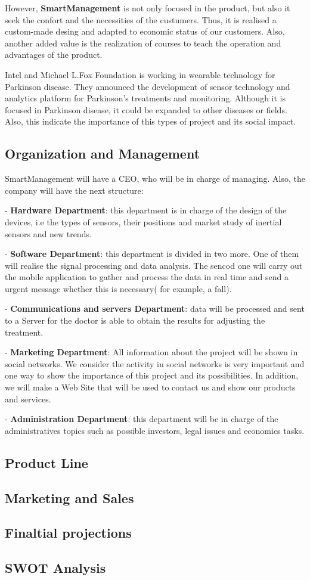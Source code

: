  However, \textbf{SmartManagement} is not only focused in the product, but also it seek the confort and the necessities of the custumers. Thus, it is realised a custom-made desing and adapted to economic status of our customers. Also, another added value is the realization of courses to teach the operation and advantages of the product.
 
 Intel and Michael L.Fox Foundation is working in wearable technology for Parkinson disease. They announced the development of sensor technology and analytics platform for Parkinson’s treatments and monitoring\cite{IntelAndMjf}. Although it is focused in Parkinson disease, it could be expanded to other diseases or fields. Also, this indicate the importance of this types of project and its social impact.


\subsection{Organization and Management}
SmartManagement will have a CEO, who will be  in charge of managing. Also, the company will have the next structure:

-	\textbf{Hardware Department}: this department is in charge of the design of the devices, i.e the types of sensors, their  positions  and market study of inertial sensors and new trends.

-	\textbf{Software Department}: this department is divided in two more. One of them will realise the signal processing and data analysis. The sencod one will carry out the mobile application to gather and process the data in real time and send a urgent message whether this is necessary( for example, a fall).

-	\textbf{Communications and servers Department}: data will be processed and sent to a Server for the doctor is able to obtain the results for adjusting the treatment.

-	\textbf{Marketing Department}: All information about the project will be shown in  social networks. We consider the activity in social networks is very important and one way to show the importance of this project and its possibilities.
In addition, we will make a Web Site that will be used to contact us and show our products and services.

-	\textbf{Administration Department}: this department will be in charge of the administratives topics such as possible investors, legal issues and economics tasks.


\subsection{Product Line}

\subsection{Marketing and Sales}

\subsection{Finaltial projections}

\subsection{SWOT Analysis}
